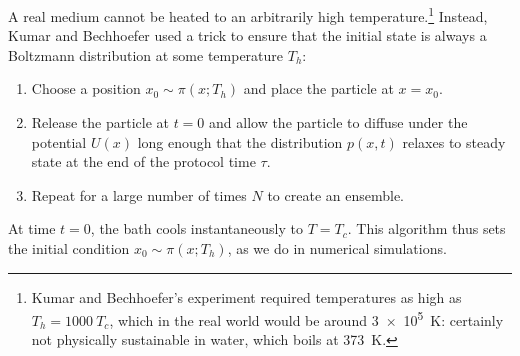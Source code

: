 \documentclass[hyperref={colorlinks=true, urlcolor=blue, citecolor=blue, final, bound}]{sfuthesis}
\begin{document}
A real medium cannot be heated to an arbitrarily high temperature.\footnote{Kumar and Bechhoefer's experiment required temperatures as high as $T_h=1000~T_c$, which in the real world would be around \qty{3e5}{\kelvin}: certainly not physically sustainable in water, which boils at \qty{373}{\kelvin}.} Instead, Kumar and Bechhoefer used a trick to ensure that the initial state is always a Boltzmann distribution at some temperature $T_h$:
\begin{enumerate}
    \item Choose a position $x_0\sim\pi(x;T_h)$ and place the particle at $x=x_0$. 
    \item Release the particle at $t=0$ and allow the particle to diffuse under the potential $U(x)$ long enough that the distribution $p(x,t)$ relaxes to steady state at the end of the protocol time $\tau$.
    \item Repeat for a large number of times $N$ to create an ensemble.
\end{enumerate}
At time $t=0$, the bath cools instantaneously to $T=T_c$. This algorithm thus sets the initial condition $x_0\sim \pi(x;T_h)$, as we do in numerical simulations. 
\end{document}
